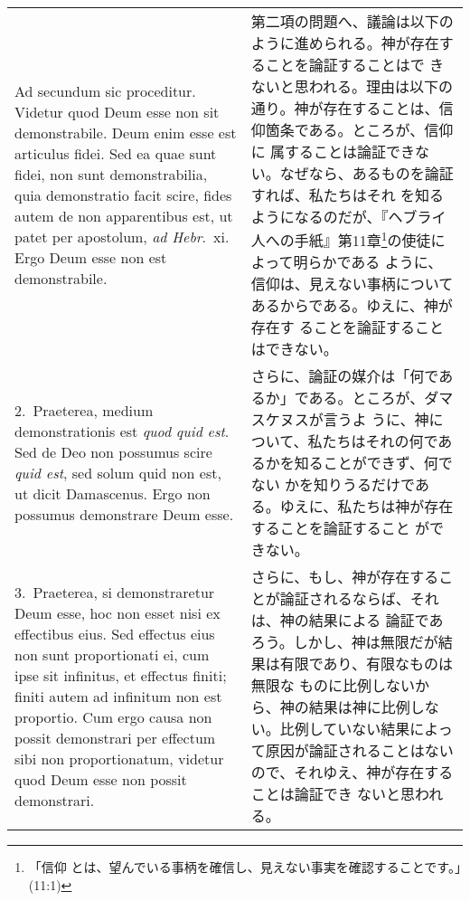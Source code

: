 \documentclass[10pt]{jsarticle} %
\begin{document}
\begin{longtable}{p{21em}p{21em}}


{\huge A}{\sc d secundum sic proceditur}. Videtur quod
 Deum esse non sit demonstrabile. Deum enim esse est articulus
 fidei. Sed ea quae sunt fidei, non sunt demonstrabilia, quia
 demonstratio facit scire, fides autem de non apparentibus est, ut patet
 per apostolum, {\it ad Hebr}.~{\sc xi}. Ergo Deum esse non est demonstrabile.


&

第二項の問題へ、議論は以下のように進められる。神が存在することを論証することはで
 きないと思われる。理由は以下の通り。神が存在することは、信仰箇条である。ところが、信仰に
 属することは論証できない。なぜなら、あるものを論証すれば、私たちはそれ
 を知るようになるのだが、『ヘブライ人への手紙』第11章\footnote{「信仰
 とは、望んでいる事柄を確信し、見えない事実を確認することです。」(11:1)}の使徒によって明らかである
 ように、信仰は、見えない事柄についてあるからである。ゆえに、神が存在す
 ることを論証することはできない。

\\



2.~{\sc Praeterea}, medium demonstrationis est {\it quod quid est}. Sed
 de Deo non possumus scire {\it quid est}, sed solum quid non est, ut
 dicit Damascenus. Ergo non possumus demonstrare Deum esse.

&
さらに、論証の媒介は「何であるか」である。ところが、ダマスケヌスが言うよ
 うに、神について、私たちはそれの何であるかを知ることができず、何でない
 かを知りうるだけである。ゆえに、私たちは神が存在することを論証すること
 ができない。

\\


3.~{\sc Praeterea}, si demonstraretur Deum esse, hoc
 non esset nisi ex effectibus eius. Sed effectus eius non sunt
 proportionati ei, cum ipse sit infinitus, et effectus finiti; finiti
 autem ad infinitum non est proportio. Cum ergo causa non possit
 demonstrari per effectum sibi non proportionatum, videtur quod Deum
 esse non possit demonstrari.

&


さらに、もし、神が存在することが論証されるならば、それは、神の結果による
 論証であろう。しかし、神は無限だが結果は有限であり、有限なものは無限な
 ものに比例しないから、神の結果は神に比例しない。比例していない結果によっ
 て原因が論証されることはないので、それゆえ、神が存在することは論証でき
 ないと思われる。


\end{longtable}
\end{document}
